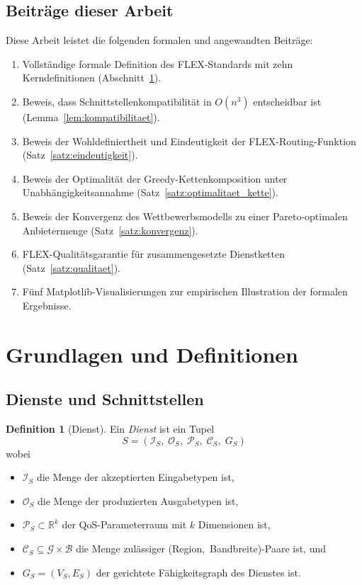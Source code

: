 ﻿\documentclass[a4paper,12pt]{article}
\theoremstyle{definition}
\newtheorem{definition}{Definition}
\begin{document}
\subsection{Beiträge dieser Arbeit}

Diese Arbeit leistet die folgenden formalen und angewandten Beiträge:

\begin{enumerate}
    \item Vollständige formale Definition des FLEX-Standards mit zehn Kerndefinitionen (Abschnitt~\ref{sec:grundlagen}).
    \item Beweis, dass Schnittstellenkompatibilität in $O(n^3)$ entscheidbar ist (Lemma~\ref{lem:kompatibilitaet}).
    \item Beweis der Wohldefiniertheit und Eindeutigkeit der FLEX-Routing-Funktion (Satz~\ref{satz:eindeutigkeit}).
    \item Beweis der Optimalität der Greedy-Kettenkomposition unter Unabhängigkeitsannahme (Satz~\ref{satz:optimalitaet_kette}).
    \item Beweis der Konvergenz des Wettbewerbsmodells zu einer Pareto-optimalen Anbietermenge (Satz~\ref{satz:konvergenz}).
    \item FLEX-Qualitätsgarantie für zusammengesetzte Dienstketten (Satz~\ref{satz:qualitaet}).
    \item Fünf Matplotlib-Visualisierungen zur empirischen Illustration der formalen Ergebnisse.
\end{enumerate}

\section{Grundlagen und Definitionen}
\label{sec:grundlagen}

\subsection{Dienste und Schnittstellen}

\begin{definition}[Dienst]
\label{def:dienst}
Ein \emph{Dienst} ist ein Tupel
\[
    S = (\mathcal{I}_S,\; \mathcal{O}_S,\; \mathcal{P}_S,\; \mathcal{C}_S,\; G_S)
\]
wobei
\begin{itemize}
    \item $\mathcal{I}_S$ die Menge der akzeptierten Eingabetypen ist,
    \item $\mathcal{O}_S$ die Menge der produzierten Ausgabetypen ist,
    \item $\mathcal{P}_S \subset \mathbb{R}^k$ der QoS-Parameterraum mit $k$ Dimensionen ist,
    \item $\mathcal{C}_S \subseteq \mathcal{G} \times \mathcal{B}$ die Menge zulässiger \mbox{(Region, Bandbreite)}-Paare ist, und
    \item $G_S = (V_S, E_S)$ der gerichtete Fähigkeitsgraph des Dienstes ist.
\end{itemize}
\end{definition}
\end{document}
